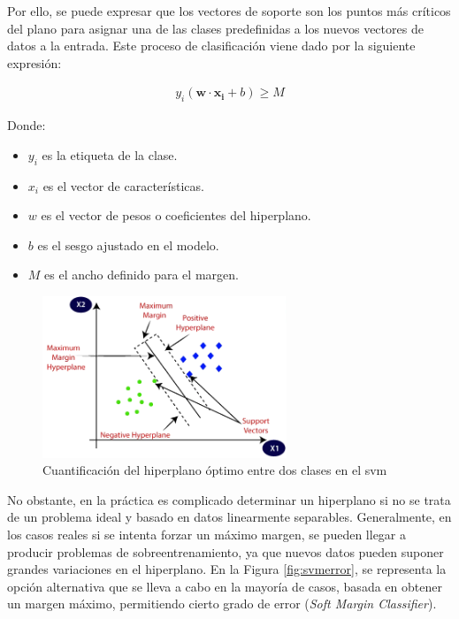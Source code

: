 \vspace{3mm}

Por ello, se puede expresar que los vectores de soporte son los puntos más críticos del plano para asignar una de las clases predefinidas a los nuevos vectores de datos a la entrada. Este proceso de clasificación viene dado por la siguiente expresión: \cite{svmmedium} 

\begin{equation}
    \begin{aligned}
        y_i(\mathbf{w} \cdot \mathbf{x_i} + b) \geq M
    \end{aligned}
\end{equation} 

    Donde:
\begin{itemize}
    \renewcommand{\labelitemi}{}
    \item \(y_i\) es la etiqueta de la clase. 
    \item \(x_i\) es el vector de características.
    \item \(w\) es el vector de pesos o coeficientes del hiperplano.
    \item \(b\) es el sesgo ajustado en el modelo.
    \item \(M\) es el ancho definido para el margen.
\end{itemize}

\vspace{3mm}

\begin{figure}[h!]
    \centering
    \includegraphics[width=0.65\textwidth]{img/teoria/svm.png}
    \caption{Cuantificación del hiperplano óptimo entre dos clases en el \acrshort{svm} \cite{svmmedium2}}
    \label{fig:svm}
\end{figure}

\vspace{3mm}

No obstante, en la práctica es complicado determinar un hiperplano si no se trata de un problema ideal y basado en datos linearmente separables. Generalmente, en los casos reales si se intenta forzar un máximo margen, se pueden llegar a producir problemas de sobreentrenamiento, ya que nuevos datos pueden suponer grandes variaciones en el hiperplano. En la Figura \ref{fig:svmerror}, se representa la opción alternativa que se lleva a cabo en la mayoría de casos, basada en obtener un margen máximo, permitiendo cierto grado de error (\textit{Soft Margin Classifier}). \cite{matlab} \cite{svmciencia}

